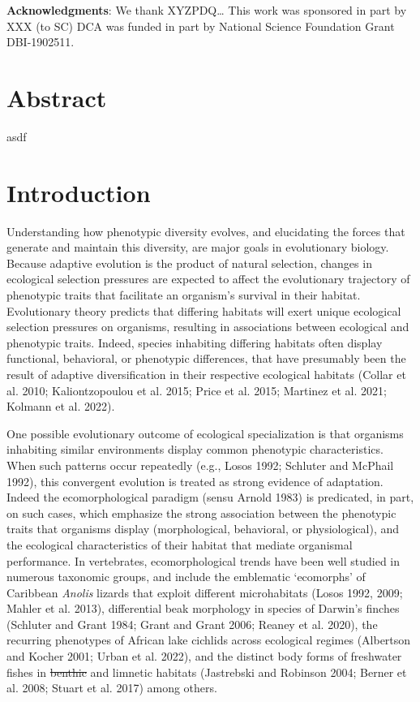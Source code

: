 \documentclass[
  11pt,
]{article}
\providecommand{\DIFaddtex}[1]{{\protect\color{blue}\uwave{#1}}} %
\providecommand{\DIFdeltex}[1]{{\protect\color{red}\sout{#1}}}                      %
\providecommand{\DIFaddbegin}{} %
\providecommand{\DIFaddend}{} %
\providecommand{\DIFdelbegin}{} %
\providecommand{\DIFdelend}{} %
\providecommand{\DIFadd}[1]{\texorpdfstring{\DIFaddtex{#1}}{#1}} %
\providecommand{\DIFdel}[1]{\texorpdfstring{\DIFdeltex{#1}}{}} %
\newcommand{\DIFscaledelfig}{0.5}
\newlength{\DIFdelgraphicswidth} %
\newlength{\DIFdelgraphicsheight} %
\newcommand{\DIFaddincludegraphics}[2][]{{\color{blue}\fbox{\DIFOincludegraphics[#1]{#2}}}} %
\newcommand{\DIFdelincludegraphics}[2][]{%
\sbox{\DIFdelgraphicsbox}{\DIFOincludegraphics[#1]{#2}}%
\settoboxwidth{\DIFdelgraphicswidth}{\DIFdelgraphicsbox} %
\settoboxtotalheight{\DIFdelgraphicsheight}{\DIFdelgraphicsbox} %
\scalebox{\DIFscaledelfig}{%
\parbox[b]{\DIFdelgraphicswidth}{\usebox{\DIFdelgraphicsbox}\\[-\baselineskip] \rule{\DIFdelgraphicswidth}{0em}}\llap{\resizebox{\DIFdelgraphicswidth}{\DIFdelgraphicsheight}{%
\setlength{\unitlength}{\DIFdelgraphicswidth}%
\begin{picture}(1,1)%
\thicklines\linethickness{2pt} %
{\color[rgb]{1,0,0}\put(0,0){\framebox(1,1){}}}%
{\color[rgb]{1,0,0}\put(0,0){\line( 1,1){1}}}%
{\color[rgb]{1,0,0}\put(0,1){\line(1,-1){1}}}%
\end{picture}%
}\hspace*{3pt}}} %
} %
\DeclareRobustCommand{\DIFaddbegin}{\DIFOaddbegin \let\includegraphics\DIFaddincludegraphics} %
\DeclareRobustCommand{\DIFaddend}{\DIFOaddend \let\includegraphics\DIFOincludegraphics} %
\DeclareRobustCommand{\DIFdelbegin}{\DIFOdelbegin \let\includegraphics\DIFdelincludegraphics} %
\DeclareRobustCommand{\DIFdelend}{\DIFOaddend \let\includegraphics\DIFOincludegraphics} %
\begin{document}
\textbf{Acknowledgments}: We thank XYZPDQ\ldots{} This work was
sponsored in part by XXX (to SC) DCA was funded in part by National
Science Foundation Grant DBI-1902511.

\newpage

\hypertarget{abstract}{%
\section{Abstract}\label{abstract}}

asdf

\newpage

\hypertarget{introduction}{%
\section{Introduction}\label{introduction}}

Understanding how phenotypic diversity evolves, and elucidating the
forces that generate and maintain this diversity, are major goals in
evolutionary biology. Because adaptive evolution is the product of
natural selection, changes in ecological selection pressures are
expected to affect the evolutionary trajectory of phenotypic traits that
facilitate an organism's survival in their habitat. Evolutionary theory
predicts that differing habitats will exert unique ecological selection
pressures on organisms, resulting in associations between ecological and
phenotypic traits. Indeed, species inhabiting differing habitats often
display functional, behavioral, or phenotypic differences, that have
presumably been the result of adaptive diversification in their
respective ecological habitats (Collar et al. 2010; Kaliontzopoulou et
al. 2015; Price et al. 2015; Martinez et al. 2021; Kolmann et al. 2022).
\hfill\break

One possible evolutionary outcome of ecological specialization is that
organisms inhabiting similar environments display common phenotypic
characteristics. When such patterns occur repeatedly (e.g., Losos 1992;
Schluter and McPhail 1992), this convergent evolution is treated as
strong evidence of adaptation. Indeed the ecomorphological paradigm
(sensu Arnold 1983) is predicated, in part, on such cases, which
emphasize the strong association between the phenotypic traits that
organisms display (morphological, behavioral, or physiological), and the
ecological characteristics of their habitat that mediate organismal
performance. In vertebrates, ecomorphological trends have been well
studied in numerous taxonomic groups, and include the emblematic
`ecomorphs' of Caribbean \emph{Anolis} lizards that exploit different
microhabitats (Losos 1992, 2009; Mahler et al. 2013), differential beak
morphology in species of Darwin's finches (Schluter and Grant 1984;
Grant and Grant 2006; Reaney et al. 2020), the recurring phenotypes of
African lake cichlids across ecological regimes (Albertson and Kocher
2001; Urban et al. 2022), and the distinct body forms of freshwater
fishes in \DIFdelbegin \DIFdel{benthic }\DIFdelend \DIFaddbegin \DIFadd{benthis }\DIFaddend and limnetic habitats (Jastrebski and Robinson 2004;
Berner et al. 2008; Stuart et al. 2017) among others. \hfill\break
\end{document}
